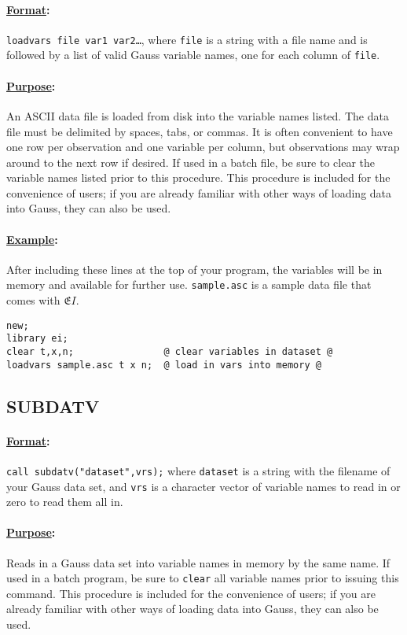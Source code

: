 \documentclass[11pt,titlepage]{article}
\newcommand{\EI}{\ensuremath{{\mathfrak EI}}}
\begin{document}
\paragraph{\underline{Format}:} \texttt{loadvars file var1
  var2\ldots}, where \texttt{file} is a string with a file name and is
followed by a list of valid Gauss variable names, one for each column
of \texttt{file}.

\paragraph{\underline{Purpose}:}
An ASCII data file is loaded from disk into the variable names listed.
The data file must be delimited by spaces, tabs, or commas.  It is
often convenient to have one row per observation and one variable per
column, but observations may wrap around to the next row if desired.
If used in a batch file, be sure to clear the variable names listed
prior to this procedure.  This procedure is included for the
convenience of users; if you are already familiar with other ways of
loading data into Gauss, they can also be used.

\paragraph{\underline{Example}:}
After including these lines at the top of your program, the variables
will be in memory and available for further use.  \texttt{sample.asc}
is a sample data file that comes with \EI.
\begin{verbatim}
new;
library ei;
clear t,x,n;                @ clear variables in dataset @
loadvars sample.asc t x n;  @ load in vars into memory @
\end{verbatim}

\subsection{SUBDATV}\label{subdatv}

\paragraph{\underline{Format}:} \texttt{call subdatv("dataset",vrs);} where
\texttt{dataset} is a string with the filename of your Gauss data set,
and \texttt{vrs} is a character vector of variable names to read in or
zero to read them all in.

\paragraph{\underline{Purpose}:}
Reads in a Gauss data set into variable names in memory by the same
name.  If used in a batch program, be sure to \texttt{clear} all
variable names prior to issuing this command.  This procedure is
included for the convenience of users; if you are already familiar
with other ways of loading data into Gauss, they can also be used.
\end{document}

